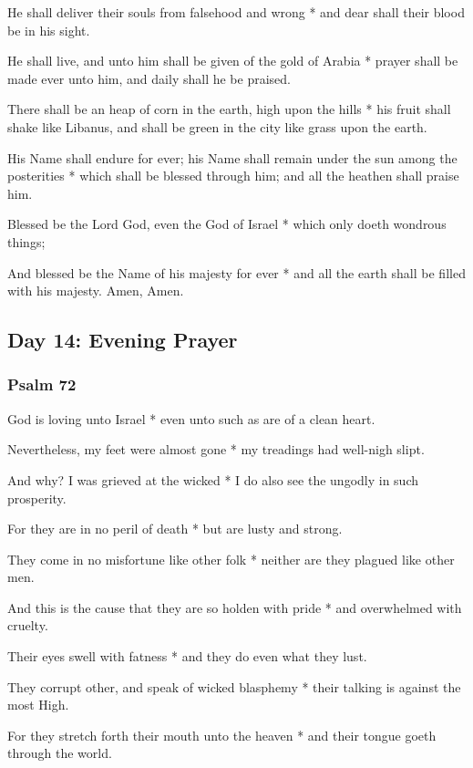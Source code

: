 He shall deliver their souls from falsehood and wrong * and dear shall their blood be in his sight.

He shall live, and unto him shall be given of the gold of Arabia * prayer shall be made ever unto him, and daily shall he be praised.

There shall be an heap of corn in the earth, high upon the hills * his fruit shall shake like Libanus, and shall be green in the city like grass upon the earth.

His Name shall endure for ever; his Name shall remain under the sun among the posterities * which shall be blessed through him; and all the heathen shall praise him.

Blessed be the Lord God, even the God of Israel * which only doeth wondrous things;

And blessed be the Name of his majesty for ever * and all the earth shall be filled with his majesty. Amen, Amen.

\subsection{Day 14: Evening Prayer}

\subsubsection{Psalm 72}


 God is loving unto Israel * even unto such as are of a clean heart.

Nevertheless, my feet were almost gone * my treadings had well-nigh slipt.

And why? I was grieved at the wicked * I do also see the ungodly in such prosperity.

For they are in no peril of death * but are lusty and strong.

They come in no misfortune like other folk * neither are they plagued like other men.

And this is the cause that they are so holden with pride * and overwhelmed with cruelty.

Their eyes swell with fatness * and they do even what they lust.

They corrupt other, and speak of wicked blasphemy * their talking is against the most High.

For they stretch forth their mouth unto the heaven * and their tongue goeth through the world.

